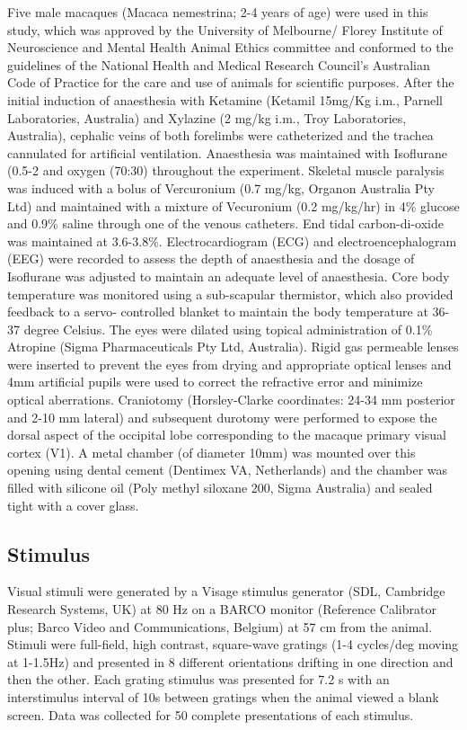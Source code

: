 		Five male macaques (Macaca nemestrina; 2-4 years of age) were used in this study, which was
	approved by the University of Melbourne/ Florey Institute of Neuroscience and Mental Health
	Animal Ethics committee and conformed to the guidelines of the National Health and Medical
	Research Council’s Australian Code of Practice for the care and use of animals for scientific
	purposes. After the initial induction of anaesthesia with Ketamine (Ketamil 15mg/Kg i.m.,
	Parnell Laboratories, Australia) and Xylazine (2 mg/kg i.m., Troy Laboratories, Australia),
	cephalic veins of both forelimbs were catheterized and the trachea cannulated for artificial
	ventilation. Anaesthesia was maintained with Isoflurane (0.5-2%
	and oxygen (70:30) throughout the experiment. Skeletal muscle paralysis was induced with a
	bolus of Vercuronium (0.7 mg/kg, Organon Australia Pty Ltd) and maintained with a mixture of
	Vecuronium (0.2 mg/kg/hr) in 4\% glucose and 0.9\% saline through one of the venous catheters.	End tidal carbon-di-oxide was maintained at 3.6-3.8\%. Electrocardiogram (ECG) and
	electroencephalogram (EEG) were recorded to assess the depth of anaesthesia and the dosage of
	Isoflurane was adjusted to maintain an adequate level of anaesthesia. Core body temperature was
	monitored using a sub-scapular thermistor, which also provided feedback to a servo- controlled
	blanket to maintain the body temperature at 36-37 degree Celsius. The eyes were dilated using
	topical administration of 0.1\% Atropine (Sigma Pharmaceuticals Pty Ltd, Australia). Rigid gas
	permeable lenses were inserted to prevent the eyes from drying and appropriate optical lenses 
	and 4mm artificial pupils were used to correct the refractive error and minimize optical
	aberrations. Craniotomy (Horsley-Clarke coordinates: 24-34 mm posterior and 2-10 mm lateral)
	and subsequent durotomy were performed to expose the dorsal aspect of the occipital lobe
	corresponding to the macaque primary visual cortex (V1). A metal chamber (of diameter 10mm)
	was mounted over this opening using dental cement (Dentimex VA, Netherlands) and the
	chamber was filled with silicone oil (Poly methyl siloxane 200, Sigma Australia) and sealed tight
	with a cover glass.
	\subsection{Stimulus}
	Visual stimuli were generated by a Visage stimulus generator (SDL, Cambridge Research
	Systems, UK) at 80 Hz on a BARCO monitor (Reference Calibrator plus; Barco Video and
	Communications, Belgium) at 57 cm from the animal. Stimuli were full-field, high contrast,
	square-wave gratings (1-4 cycles/deg moving at 1-1.5Hz) and presented in 8 different
	orientations drifting in one direction and then the other. Each grating stimulus was presented for
	7.2 s with an interstimulus interval of 10s between gratings when the animal viewed a blank
	screen. Data was collected for 50 complete presentations of each stimulus.
